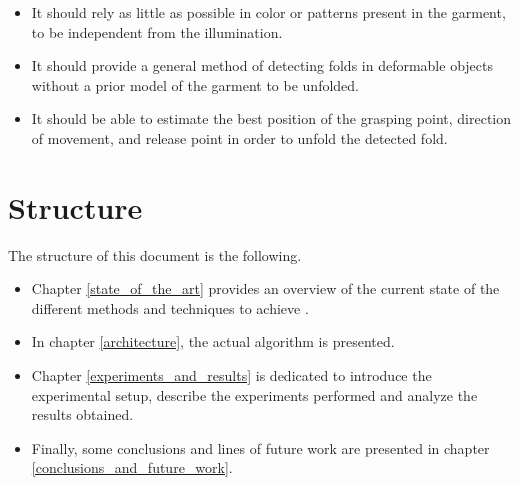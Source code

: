 \begin{itemize}
	\item It should rely as little as possible in color or patterns present in the garment, to be independent from the illumination.
	\item It should provide a general method of detecting folds in deformable objects without a prior model of the garment to be unfolded.
	\item It should be able to estimate the best position of the grasping point, direction of movement, and release point in order to unfold the detected fold.
\end{itemize}


\section{Structure}
\label{intro_structure}

The structure of this document is the following. 

\begin{itemize}
\item Chapter \ref{state_of_the_art} provides an overview of the current state of the different methods and techniques to achieve .
\item In chapter \ref{architecture}, the actual algorithm is presented. 
\item Chapter \ref{experiments_and_results} is dedicated to introduce the experimental setup, describe the experiments performed and analyze the results obtained.
\item Finally, some conclusions and lines of future work are presented in chapter \ref{conclusions_and_future_work}.

\end{itemize}
